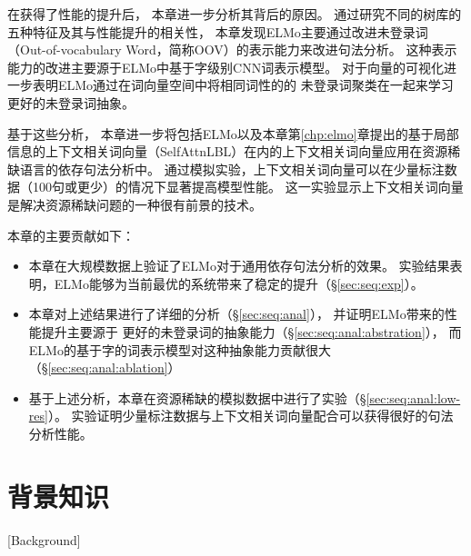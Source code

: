 在获得了性能的提升后，
本章进一步分析其背后的原因。
通过研究不同的树库的五种特征及其与性能提升的相关性，
本章发现ELMo主要通过改进未登录词（Out-of-vocabulary Word，简称OOV）的表示能力来改进句法分析。
这种表示能力的改进主要源于ELMo中基于字级别CNN词表示模型。
对于向量的可视化进一步表明ELMo通过在词向量空间中将相同词性的的
未登录词聚类在一起来学习更好的未登录词抽象。

基于这些分析，
本章进一步将包括ELMo以及本章第\ref{chp:elmo}章提出的基于局部信息的上下文相关词向量（SelfAttnLBL）在内的上下文相关词向量应用在资源稀缺语言的依存句法分析中。
通过模拟实验，上下文相关词向量可以在少量标注数据（100句或更少）的情况下显著提高模型性能。
这一实验显示上下文相关词向量是解决资源稀缺问题的一种很有前景的技术。

本章的主要贡献如下：
\begin{itemize}
	\item 本章在大规模数据上验证了ELMo对于通用依存句法分析的效果。
	实验结果表明，ELMo能够为当前最优的系统带来了稳定的提升（\S\ref{sec:seq:exp}）。
	\item 本章对上述结果进行了详细的分析（\S\ref{sec:seq:anal}），
	并证明ELMo带来的性能提升主要源于
	更好的未登录词的抽象能力（\S\ref{sec:seq:anal:abstration}），
	而ELMo的基于字的词表示模型对这种抽象能力贡献很大（\S\ref{sec:seq:anal:ablation}）
	\item 基于上述分析，本章在资源稀缺的模拟数据中进行了实验（\S\ref{sec:seq:anal:low-res}）。
	实验证明少量标注数据与上下文相关词向量配合可以获得很好的句法分析性能。
\end{itemize}

\section{背景知识}[Background]

